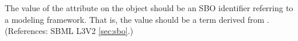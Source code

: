 The value of the attribute  on the \SBML object should be
an SBO identifier referring to a modeling framework.  That is, the
value should be a term derived from \sboframework.  (References: SBML
 L3V2 \ref{sec:sbo}.)
